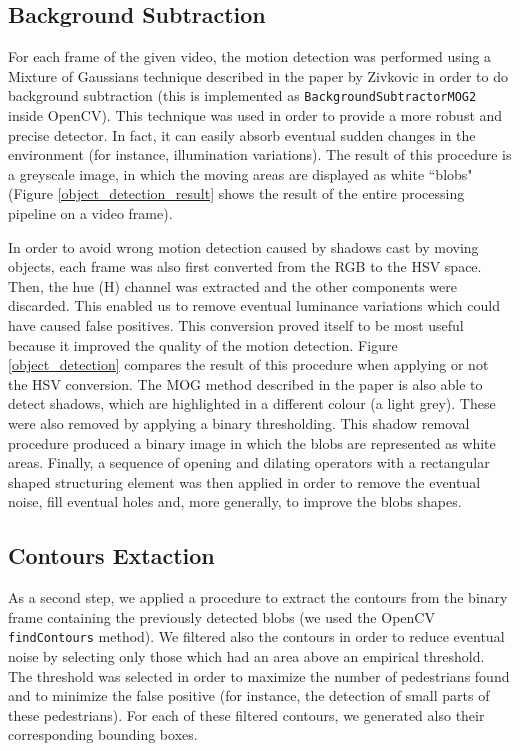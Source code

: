\documentclass[runningheads]{llncs}
\begin{document}
\subsection{Background Subtraction}
For each frame of the given video, the motion detection was performed using a Mixture of Gaussians technique described in the paper by Zivkovic \cite{Mog} in order to do background subtraction (this is implemented as \texttt{BackgroundSubtractorMOG2}\cite{backgroundsubtractormog} inside OpenCV). This technique was used in order to provide a more robust and precise detector. In fact, it can easily absorb eventual sudden changes in the environment (for instance, illumination variations). The result of this procedure is a greyscale image, in which the moving areas are displayed as white ``blobs" (Figure \ref{object_detection_result} shows the result of the entire processing pipeline on a video frame).
\smallskip

In order to avoid wrong motion detection caused by shadows cast by moving objects, each frame was also first converted from the RGB to the HSV space. Then, the hue (H) channel was extracted and the other components were discarded. This enabled us to remove eventual luminance variations which could have caused false positives.
This conversion proved itself to be most useful because it improved the quality of the motion detection. Figure \ref{object_detection} compares the result of this procedure when applying or not the HSV conversion.
The MOG method described in the paper is also able to detect shadows, which are highlighted in a different colour (a light grey). These were also removed by applying a binary thresholding. This shadow removal procedure produced a binary image in which the blobs are represented as white areas. 
Finally,  a sequence of opening and dilating operators with a rectangular shaped structuring element was then applied in order to remove the eventual noise, fill eventual holes and, more generally, to improve the blobs shapes.
\smallskip

\subsection{Contours Extaction}
As a second step, we applied a procedure to extract the contours from the binary frame containing the previously detected blobs (we used the OpenCV \texttt{findContours} \cite{findcontours} method). We filtered also the contours in order to reduce eventual noise by selecting only those which had an area above an empirical threshold. The threshold was selected in order to maximize the number of pedestrians found and to minimize the false positive (for instance, the detection of small parts of these pedestrians).  For each of these filtered contours, we generated also their corresponding bounding boxes.
\end{document}
